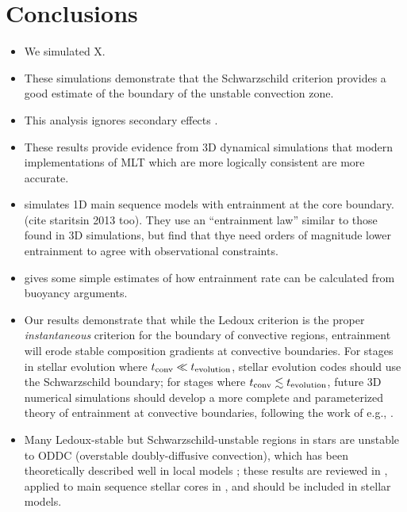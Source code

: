 \section{Conclusions}
\label{sec:conclusions}

\begin{itemize}
    \item We simulated X.
    \item These simulations demonstrate that the Schwarzschild criterion provides a good estimate of the boundary of the unstable convection zone.
    \item This analysis ignores secondary effects \citep[e.g., convective penetration][because we designed our experiments to minimize these effects]{anders_etal_2022}.
    \item These results provide evidence from 3D dynamical simulations that modern implementations of MLT \citep{mesa4, mesa5} which are more logically consistent \citep{gabriel_etal_2014} are more accurate.
    \item \citet{scott_etal_2021} simulates 1D main sequence models with entrainment at the core boundary. (cite staritsin 2013 too). They use an ``entrainment law'' similar to those found in 3D simulations, but find that thye need orders of magnitude lower entrainment to agree with observational constraints.
    \item \citet{spruit_2015} gives some simple estimates of how entrainment rate can be calculated from buoyancy arguments.
    \item Our results demonstrate that while the Ledoux criterion is the proper \emph{instantaneous} criterion for the boundary of convective regions, entrainment will erode stable composition gradients at convective boundaries.
        For stages in stellar evolution where $t_{\rm{conv}} \ll t_{\rm{evolution}}$, stellar evolution codes should use the Schwarzschild boundary; for stages where $t_{\rm{conv}} \lesssim t_{\rm{evolution}}$, future 3D numerical simulations should develop a more complete and parameterized theory of entrainment at convective boundaries, following the work of e.g., \citet{turner_1968, fuentes_cumming_2020}.
    \item Many Ledoux-stable but Schwarzschild-unstable regions in stars are unstable to ODDC (overstable doubly-diffusive convection), which has been theoretically described well in local models \citep{mirouh_etal_2012, wood_etal_2013, xie_etal_2017}; these results are reviewed in \citet{garaud_2018}, applied to main sequence stellar cores in \citet{moore_garaud_2016}, and should be included in stellar models.
\end{itemize}

